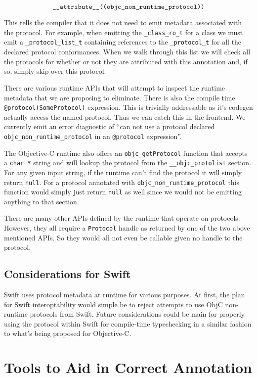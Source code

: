 \documentclass{article}
\begin{document}
\[ \verb|__attribute__((objc_non_runtime_protocol))| \]

This tells the compiler that it does not need to emit metadata associated with
the protocol. For example, when emitting the \verb|_class_ro_t| for a class we
must emit a \verb|_protocol_list_t| containing references to the
\verb|_protocol_t| for all the declared protocol conformances. When we walk
through this list we will check all the protocols for whether or not they are
attributed with this annotation and, if so, simply skip over this protocol.

There are various runtime APIs that will attempt to inspect the runtime metadata
that we are proposing to eliminate. There is also the compile time \linebreak
\verb|@protocol(SomeProtocol)| expression. This is trivially addressable as it's
codegen actually access the named protocol. Thus we can catch this in the
frontend. We currently emit an error diagnostic of ``can not use a protocol
declared \verb|objc_non_runtime_protocol| in an \verb|@protocol| expression''.

The Objective-C runtime also offers an \verb|objc_getProtocol| function that
accepts a \verb|char *| string and will lookup the protocol from the
\verb|__objc_protolist| section. For any given input string, if the
runtime can't find the protocol it will simply return \verb|null|. For a protocol
annotated with \verb|objc_non_runtime_protocol| this function would simply just
return \verb|null| as well since we would not be emitting anything to that
section.

There are many other APIs defined by the runtime that operate on protocols.
However, they all require a \verb|Protocol| handle as returned by one of the two
above mentioned APIs. So they would all not even be callable given no handle to
the protocol.

\subsection{Considerations for Swift}

Swift uses protocol metadata at runtime for various purposes. At first, the plan
for Swift interoptability would simple be to reject attempts to use ObjC
non-runtime protocols from Swift. Future considerations could be main for
properly using the protocol within Swift for compile-time typechecking in a
similar fashion to what's being proposed for Objective-C.

\section{Tools to Aid in Correct Annotation}
\end{document}
